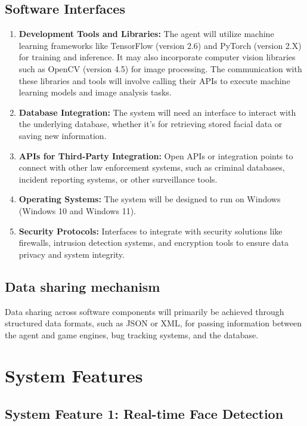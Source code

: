 \documentclass{scrreprt}
\begin{document}
    \section{Software Interfaces}
            \begin{enumerate}
                \item \textbf{Development Tools and Libraries:} The agent will utilize machine learning frameworks like TensorFlow (version 2.6) and PyTorch (version 2.X) for training and inference. It may also incorporate computer vision libraries such as OpenCV (version 4.5) for image processing. The communication with these libraries and tools will involve calling their APIs to execute machine learning models and image analysis tasks.
                \item \textbf{Database Integration:} The system will need an interface to interact with the underlying database, whether it's for retrieving stored facial data or saving new information.
                \item \textbf{APIs for Third-Party Integration:} Open APIs or integration points to connect with other law enforcement systems, such as criminal databases, incident reporting systems, or other surveillance tools.
                \item \textbf{Operating Systems:} The system will be designed to run on  Windows (Windows 10 and Windows 11).
                \item \textbf{Security Protocols:} Interfaces to integrate with security solutions like firewalls, intrusion detection systems, and encryption tools to ensure data privacy and system integrity.
            \end{enumerate}
    \section{Data sharing mechanism}
        Data sharing across software components will primarily be achieved through structured data formats, such as JSON or XML, for passing information between the agent and game engines, bug tracking systems, and the database.


\chapter{System Features}  
    \section{System Feature 1: Real-time Face Detection}   
\end{document}
